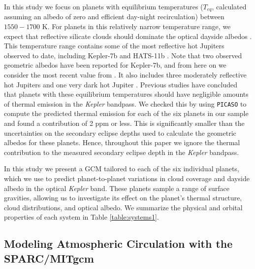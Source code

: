 \documentclass[twocolumn]{aastex63}
\begin{document}
In this study we focus on planets with equilibrium temperatures ($T_{eq}$, calculated assuming an albedo of zero and efficient day-night recirculation) between $1550-1700$ K.  For planets in this relatively narrow temperature range, we expect that reflective silicate clouds should dominate the optical dayside albedos \citep[e.g.][]{parmentier2016,powell2018,parmentier2021,gao2020,roman2021}. This temperature range contains some of the most reflective hot Jupiters observed to date, including Kepler-7b \citep{demory2013,heng2020} and HATS-11b \citep{niraula2018}. Note that two observed geometric albedos have been reported for Kepler-7b, and from here on we consider the most recent value from \citet{heng2020}.  It also includes three moderately reflective hot Jupiters \citep[Kepler-8b, Kepler-17b, and K2-107b;][]{esteves2013,desert2011,niraula2018} and one very dark hot Jupiter \citep[K2-31b;][]{niraula2018}.  Previous studies \citep[e.g.,][]{demory2013} have concluded that planets with these equilibrium temperatures should have negligible amounts of thermal emission in the \emph{Kepler} bandpass.  We checked this by using \texttt{PICASO} to compute the predicted thermal emission for each of the six planets in our sample and found a contribution of 2 ppm or less.  This is significantly smaller than the uncertainties on the secondary eclipse depths used to calculate the geometric albedos for these planets. Hence, throughout this paper we ignore the thermal contribution to the measured secondary eclipse depth in the \emph{Kepler} bandpass.

In this study we present a GCM tailored to each of the six individual planets, which we use to predict planet-to-planet variations in cloud coverage and dayside albedo in the optical \emph{Kepler} band. These planets sample a range of surface gravities, allowing us to investigate its effect on the planet's thermal structure, cloud distributions, and optical albedo. We summarize the physical and orbital properties of each system in Table \ref{table:systems1}. 



\subsection{Modeling Atmospheric Circulation with the SPARC/MITgcm}\label{sec:gcm}
\end{document}
